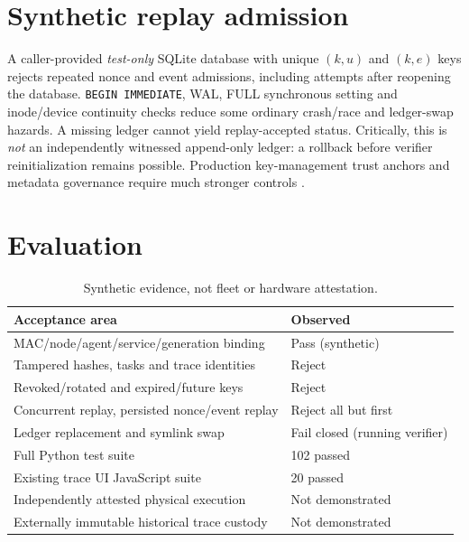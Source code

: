 \documentclass[11pt]{article}
\begin{document}
\section{Synthetic replay admission}
A caller-provided \emph{test-only} SQLite database with unique $(k,u)$ and $(k,e)$ keys rejects repeated nonce and event admissions, including attempts after reopening the database. \texttt{BEGIN IMMEDIATE}, WAL, FULL synchronous setting and inode/device continuity checks reduce some ordinary crash/race and ledger-swap hazards. A missing ledger cannot yield replay-accepted status. Critically, this is \emph{not} an independently witnessed append-only ledger: a rollback before verifier reinitialization remains possible. Production key-management trust anchors and metadata governance require much stronger controls \cite{nist57}.
\section{Evaluation}
\begin{table}[h]\centering
\caption{Synthetic evidence, not fleet or hardware attestation.}
\begin{tabular}{ll}\toprule
Acceptance area & Observed\\\midrule
MAC/node/agent/service/generation binding & Pass (synthetic)\\
Tampered hashes, tasks and trace identities & Reject\\
Revoked/rotated and expired/future keys & Reject\\
Concurrent replay, persisted nonce/event replay & Reject all but first\\
Ledger replacement and symlink swap & Fail closed (running verifier)\\
Full Python test suite & 102 passed\\
Existing trace UI JavaScript suite & 20 passed\\
Independently attested physical execution & Not demonstrated\\
Externally immutable historical trace custody & Not demonstrated\\\bottomrule
\end{tabular}
\end{table}
\end{document}
